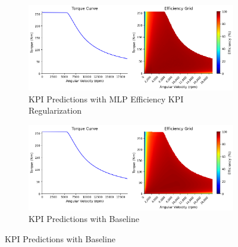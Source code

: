 \documentclass{report} %
\begin{document}
\begin{figure}[H]
    \centering
    \begin{subfigure}{1\textwidth}
        \centering
        \includegraphics[width=1\textwidth]{./ReportImages/predictions.png} 
        \caption{KPI Predictions with MLP Efficiency KPI Regularization} 
        \label{KPI_Predictions_with_MLP_Efficiency}
    \end{subfigure}\hfill
    \begin{subfigure}{1\textwidth}
        \centering
        \includegraphics[width=1\textwidth]{./ReportImages/predictions_Baseline.png} 
        \caption{KPI Predictions with Baseline} 
        \label{KPI_Predictions_with_Baseline}
    \end{subfigure}\hfill
\end{figure}
\end{document}
